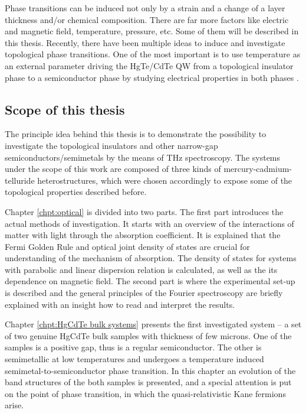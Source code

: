 \documentclass[titlepage,a4paper]{book}
\newcommand{\wciecie}{\quad\phantom{v}}
\begin{document}
Phase transitions can be induced not only by a strain and a change of a layer thickness and/or chemical composition. There are far more factors like electric and magnetic field, temperature, pressure, etc. Some of them will be described in this thesis. Recently, there have been multiple ideas to induce and investigate topological phase transitions. One of the most important is to use temperature as an external parameter driving the HgTe/CdTe QW from a topological insulator phase to a semiconductor phase by studying electrical properties in both phases \cite{Wiedmann_State}. 

\subsection{Scope of this thesis}
\wciecie
The principle idea behind this thesis is to demonstrate the possibility to investigate the topological insulators and other narrow-gap semiconductors/semimetals by the means of THz spectroscopy. The systems under the scope of this work are composed of three kinds of mercury-cadmium-telluride heterostructures, which were chosen accordingly to expose some of the topological properties described before.

Chapter \ref{chpt:optical} is divided into two parts. The first part introduces the actual methods of investigation. It starts with an overview of the interactions of matter with light through the absorption coefficient. It is explained that the Fermi Golden Rule and optical joint density of states are crucial for understanding of the mechanism of absorption. The density of states for systems with parabolic and linear dispersion relation is calculated, as well as the its dependence on magnetic field. The second part is where the experimental set-up is described and the general principles of the Fourier spectroscopy are briefly explained with an insight how to read and interpret the results.  

Chapter \ref{chpt:HgCdTe bulk systems} presents the first investigated system -- a set of two genuine HgCdTe bulk samples with thickness of few microns. One of the samples is a positive gap, thus is a regular semiconductor. The other is semimetallic at low temperatures and undergoes a temperature induced semimetal-to-semiconductor phase transition. In this chapter an evolution of the band structures of the both samples is presented, and a special attention is put on the point of phase transition, in which the quasi-relativistic Kane fermions arise.   
\end{document}
